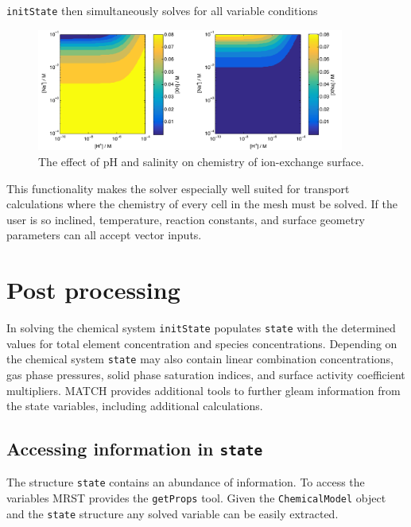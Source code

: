 \documentclass{article}
\begin{document}
\verb|initState| then simultaneously solves for all variable conditions

\begin{figure}[H]
    \centering
    \includegraphics[width=0.9\textwidth]{sweep.pdf}
    \caption{The effect of pH and salinity on chemistry of ion-exchange surface.}
    \label{fig:my_label}
\end{figure}

This functionality makes the solver especially well suited for transport calculations where the chemistry of every cell in the mesh must be solved. If the user is so inclined, temperature, reaction constants, and surface geometry parameters can all accept vector inputs.

\section{Post processing}

In solving the chemical system \verb|initState| populates \verb|state| with the determined values for total element concentration and species concentrations. Depending on the chemical system \verb|state| may also contain linear combination concentrations, gas phase pressures, solid phase saturation indices, and surface activity coefficient multipliers. MATCH provides additional tools to further gleam information from the state variables, including additional calculations.

\subsection{Accessing information in \texttt{state}}
The structure \verb|state| contains an abundance of information. To access the variables MRST provides the \verb|getProps| tool. Given the \verb|ChemicalModel| object and the \verb|state| structure any solved variable can be easily extracted. 
\end{document}
